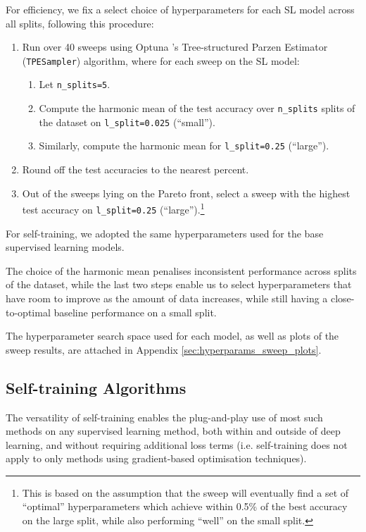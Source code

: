 \documentclass{article}
\begin{document}
For efficiency, we fix a select choice of hyperparameters for each SL model across all
splits, following this procedure: \begin{enumerate}
  \item Run over 40 sweeps using Optuna \cite{akiba2019optuna}'s Tree-structured
  Parzen Estimator (\texttt{TPESampler}) algorithm, where for each sweep on the SL
  model:
  \begin{enumerate}
    \item Let \texttt{n\_splits=5}.
    \item Compute the harmonic mean of the test accuracy over \texttt{n\_splits} splits
    of the dataset on \texttt{l\_split=0.025} (``small'').
    \item Similarly, compute the harmonic mean for \texttt{l\_split=0.25} (``large'').
  \end{enumerate}
  \item Round off the test accuracies to the nearest percent.
  \item Out of the sweeps lying on the Pareto front, select a sweep with the highest
  test accuracy on \texttt{l\_split=0.25} (``large'').\footnote{%
    This is based on the assumption that the sweep will eventually find a set of
    ``optimal'' hyperparameters which achieve within 0.5\% of the best accuracy on the
    large split, while also performing ``well'' on the small split.
  }
\end{enumerate}
For self-training, we adopted the same hyperparameters used for the base supervised
learning models.

The choice of the harmonic mean penalises inconsistent performance across splits of the
dataset, while the last two steps enable us to select hyperparameters that have room to
improve as the amount of data increases, while still having a close-to-optimal baseline
performance on a small split.

The hyperparameter search space used for each model, as well as plots of the sweep
results, are attached in Appendix \ref{sec:hyperparams_sweep_plots}.

\subsection{Self-training Algorithms}

The versatility of self-training enables the plug-and-play use of most such methods on
any supervised learning method, both within and outside of deep learning, and without
requiring additional loss terms (i.e. self-training does not apply to only methods
using gradient-based optimisation techniques).
\end{document}
